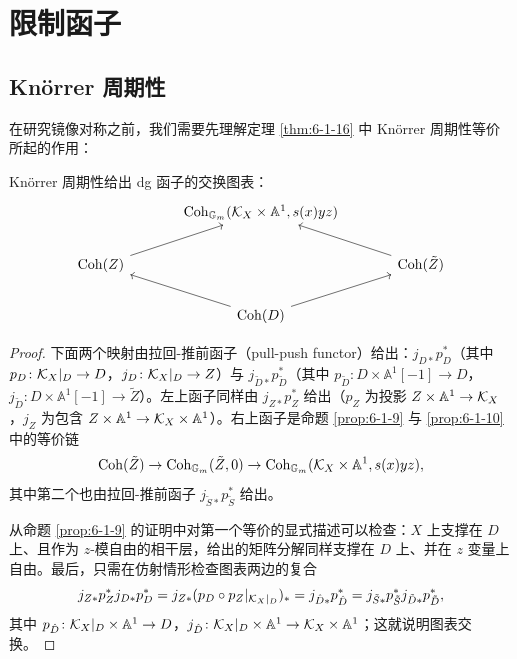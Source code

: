 \section{限制函子}

\subsection{Kn{\"o}rrer 周期性}

在研究镜像对称之前，我们需要先理解定理 \ref{thm:6-1-16} 中 Kn{\"o}rrer 周期性等价所起的作用：

\begin{lemma}\label{lem:8-1-1}
Kn{\"o}rrer 周期性给出 dg 函子的交换图表：
\[
\begin{tikzcd}[column sep=3.4em, row sep=1.9em]
& \operatorname{Coh}_{\mathbb G_m}(\cK_X\times\mathbb A^1,s(x)yz) & \\
\operatorname{Coh}(Z) \arrow[ur] & & \operatorname{Coh}(\tilde Z) \arrow[ul] \\
& \operatorname{Coh}(D) \arrow[ul] \arrow[ur] &
\end{tikzcd}
\]
\end{lemma}


\begin{proof}
下面两个映射由拉回-推前函子（pull-push functor）给出：$j_{D*}p_D^*$（其中 $p_D\colon\mathcal{K}_X|_D\to D$，$j_D\colon\mathcal{K}_X|_D\to Z$）与 $j_{\tilde D*}p_{\tilde D}^*$（其中 $p_{\tilde D}\colon D\times\mathbb A^1[-1]\to D$，$j_{\tilde D}\colon D\times\mathbb A^1[-1]\to\tilde Z$）。左上函子同样由 $j_{Z*}p_Z^*$ 给出（$p_Z$ 为投影 $Z\times\mathbb A^1\to\mathcal{K}_X$，$j_Z$ 为包含 $Z\times\mathbb A^1\to\mathcal{K}_X\times\mathbb A^1$）。右上函子是命题 \ref{prop:6-1-9} 与 \ref{prop:6-1-10} 中的等价链
\[
\operatorname{Coh}(\tilde Z)\to\operatorname{Coh}_{\mathbb G_m}(\tilde Z,0)\to\operatorname{Coh}_{\mathbb G_m}(\mathcal{K}_X\times\mathbb A^1,s(x)yz),
\]
其中第二个也由拉回-推前函子 $j_{\tilde S*}p_{\tilde S}^*$ 给出。

从命题 \ref{prop:6-1-9} 的证明中对第一个等价的显式描述可以检查：$X$ 上支撑在 $D$ 上、且作为 $z$-模自由的相干层，给出的矩阵分解同样支撑在 $D$ 上、并在 $z$ 变量上自由。最后，只需在仿射情形检查图表两边的复合
\[
j_{Z*}p_Z^*j_{D*}p_D^*=j_{Z*}(p_D\circ p_Z|_{\mathcal{K}_X|_D})_*=j_{\hat D*}p_{\hat D}^*=j_{\tilde S*}p_{\tilde S}^*j_{\tilde D*}p_{\tilde D}^*,
\]
其中 $p_{\hat D}\colon\mathcal{K}_X|_D\times\mathbb A^1\to D$，$j_{\hat D}\colon\mathcal{K}_X|_D\times\mathbb A^1\to\mathcal{K}_X\times\mathbb A^1$；这就说明图表交换。
\end{proof}

